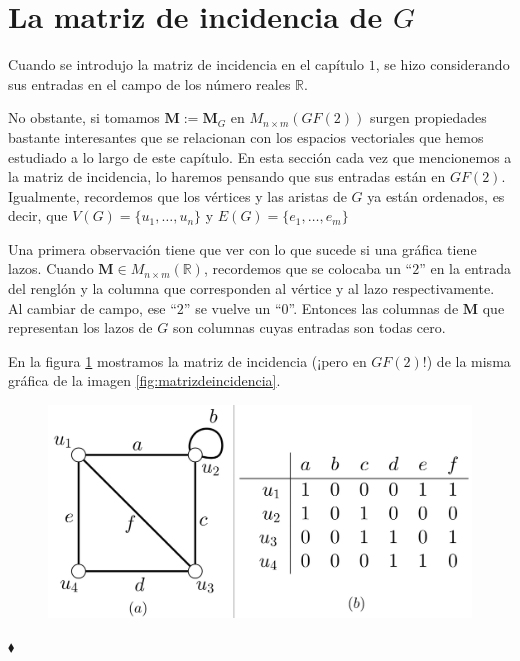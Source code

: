 \section{La matriz de incidencia de $G$}
Cuando se introdujo la matriz de incidencia en el capítulo $1$, se hizo considerando sus entradas en el campo de los número reales $\mathbb{R}$.

No obstante, si tomamos $\mathbf{M}:=\mathbf{M}_{G}$ en $M_{n \times m}(GF(2))$ surgen propiedades bastante interesantes que se relacionan con los espacios vectoriales que hemos estudiado a lo largo de este capítulo. En esta sección cada vez que mencionemos a la matriz de incidencia, lo haremos pensando que sus entradas están en $GF(2)$. Igualmente, recordemos que los vértices y las aristas de $G$ ya están ordenados, es decir, que $V(G)=\{u_{1}, \ldots, u_{n}\}$ y $E(G) = \{e_{1}, \ldots, e_{m}\}$

Una primera observación tiene que ver con lo que sucede si una gráfica tiene lazos. Cuando $\mathbf{M} \in M_{n \times m}(\mathbb{R})$, recordemos que se colocaba un ``$2$'' en la entrada del renglón y la columna que corresponden al vértice y al lazo respectivamente. Al cambiar de campo, ese ``$2$'' se vuelve un ``$0$''. Entonces las columnas de $\mathbf{M}$ que representan los lazos de $G$  son columnas cuyas entradas son todas cero.

\begin{ejem}
En la figura \ref{matrizdeincidenciagf2} mostramos la matriz de incidencia (¡pero en $GF(2)$!) de la misma gráfica de la imagen \ref{fig:matrizdeincidencia}.
\begin{figure}[H]
    \centering
    \includegraphics[scale=0.25]{img/imgchapter3/matrizdeincidenciagf2.jpg}
    \caption{}
    \label{matrizdeincidenciagf2}
\end{figure}
\vspace{-0.5cm}
\hfill $\blacklozenge$
\end{ejem}


